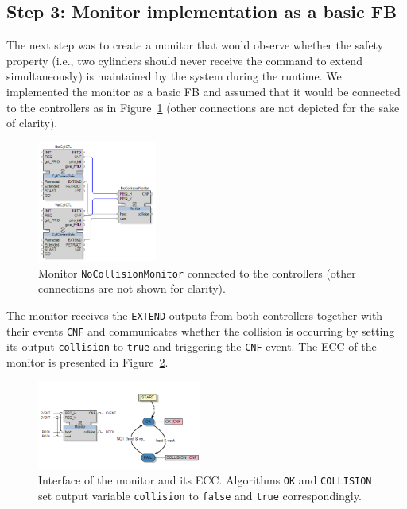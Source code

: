 \begin{bibunit}
\subsection{Step 3: Monitor implementation as a basic FB}

The next step was to create a monitor that would observe whether the safety property (i.e., two cylinders should never receive the command to extend simultaneously) is maintained by the system during the runtime. We implemented the monitor as a basic FB and assumed that it would be connected to the controllers as in Figure~\ref{fig:monitorplacement} (other connections are not depicted for the sake of clarity).

\begin{figure}[h!]
    \centering
    \includegraphics[width=0.35\textwidth]{MX_Papers/Paper3/pic/monitorplacement.png}
    \caption{Monitor \texttt{NoCollisionMonitor} connected to the controllers (other connections are not shown for clarity).}
    \label{fig:monitorplacement}
\end{figure}

The monitor receives the \texttt{EXTEND} outputs from both controllers together with their events \texttt{CNF} and communicates whether the collision is occurring by setting its output \texttt{collision} to \texttt{true} and triggering the \texttt{CNF} event. The ECC of the monitor is presented in Figure~\ref{fig:monitorecc}.

\begin{figure}[h!]
    \centering
    \includegraphics[width=0.48\textwidth]{MX_Papers/Paper3/pic/monitorecc.png}
    \caption{Interface of the monitor and its ECC. Algorithms \texttt{OK} and \texttt{COLLISION} set output variable \texttt{collision} to \texttt{false} and \texttt{true} correspondingly.}
    \label{fig:monitorecc}
\end{figure}


\end{bibunit}
